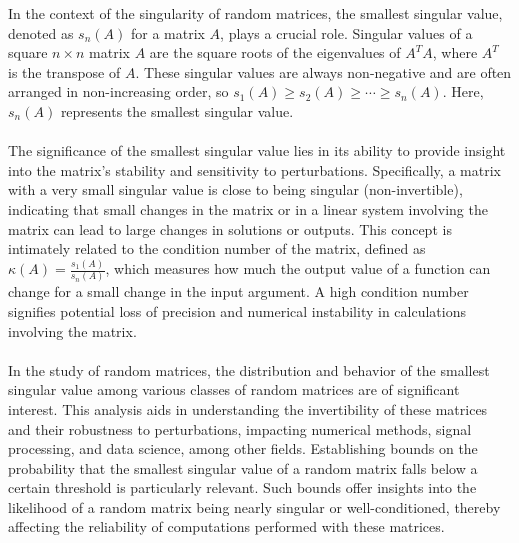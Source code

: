 In the context of the singularity of random matrices, the smallest singular value, denoted as $s_n(A)$ for a matrix $A$, plays a crucial role. Singular values of a square $n \times n$ matrix $A$ are the square roots of the eigenvalues of $A^TA$, where $A^T$ is the transpose of $A$. These singular values are always non-negative and are often arranged in non-increasing order, so $s_1(A) \geq s_2(A) \geq \cdots \geq s_n(A)$. Here, $s_n(A)$ represents the smallest singular value.\\\\
The significance of the smallest singular value lies in its ability to provide insight into the matrix's stability and sensitivity to perturbations. Specifically, a matrix with a very small singular value is close to being singular (non-invertible), indicating that small changes in the matrix or in a linear system involving the matrix can lead to large changes in solutions or outputs. This concept is intimately related to the condition number of the matrix, defined as $\kappa(A) = \frac{s_1(A)}{s_n(A)}$, which measures how much the output value of a function can change for a small change in the input argument. A high condition number signifies potential loss of precision and numerical instability in calculations involving the matrix.\\\\
In the study of random matrices, the distribution and behavior of the smallest singular value among various classes of random matrices are of significant interest. This analysis aids in understanding the invertibility of these matrices and their robustness to perturbations, impacting numerical methods, signal processing, and data science, among other fields. Establishing bounds on the probability that the smallest singular value of a random matrix falls below a certain threshold is particularly relevant. Such bounds offer insights into the likelihood of a random matrix being nearly singular or well-conditioned, thereby affecting the reliability of computations performed with these matrices.\\\
